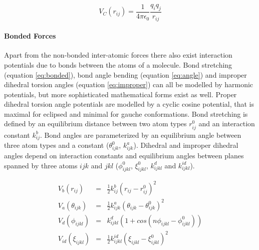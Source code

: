 \documentclass[english, a4paper, 12pt, titlepage, draft]{article}
\begin{document}
\begin{equation}
    V_C(r_{ij}) = \frac{1}{4\pi \epsilon_0} \frac{q_i q_j}{r_{ij}}
    \label{eq:CoulombPot}
\end{equation}

\paragraph{Bonded Forces}
Apart from the non-bonded inter-atomic forces there also exist interaction potentials due to bonds between the atoms of a molecule.
Bond stretching (equation \ref{eq:bonded}), bond angle bending (equation \ref{eq:angle}) and improper dihedral torsion angles (equation \ref{eq:improper}) can all be modelled by harmonic potentials, but more sophisticated mathematical forms exist as well.
Proper dihedral torsion angle potentials are modelled by a cyclic cosine potential, that is maximal for eclipsed and minimal for gauche conformations.
Bond stretching is defined by an equilibrium distance between two atom types $r^0_{ij}$ and an interaction constant $k^b_{ij}$.
Bond angles are parameterized by an equilibrium angle between three atom types and a constant ($\theta^0_{ijk}$, $k^a_{ijk}$).
Dihedral and improper dihedral angles depend on interaction constants and equilibrium angles between planes spanned by three atoms $ijk$ and $jkl$ ($\phi^0_{ijkl}$, $\xi^0_{ijkl}$, $k^d_{ijkl}$ and $k^{id}_{ijkl}$).


\begin{eqnarray}
    V_b(r_{ij})        & = & \frac{1}{2} k^b_{ij}(r_{ij}-r^0_{ij})^2 \label{eq:bonded} \\
    V_a(\theta_{ijk})  & = & \frac{1}{2} k^a_{ijk}(\theta_{ijk}-\theta^0_{ijk})^2 \label{eq:angle} \\
    V_d(\phi_{ijkl})   & = & k^d_{ijkl}(1+cos(n\phi_{ijkl}-\phi^0_{ijkl})) \label{eq:dihedral}\\
    V_{id}(\xi_{ijkl}) & = & \frac{1}{2} k^{id}_{ijkl}(\xi_{ijkl}-\xi^0_{ijkl})^2 \label{eq:improper}
\end{eqnarray}
\end{document}
